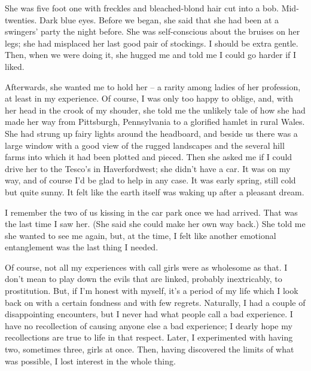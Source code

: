 She was five foot one with freckles and bleached-blond hair cut into a bob. Mid-twenties. Dark blue eyes. Before we began, she said that she had been at a swingers' party the night before. She was self-conscious about the bruises on her legs; she had misplaced her last good pair of stockings. I should be extra gentle. Then, when we were doing it, she hugged me and told me I could go harder if I liked.

Afterwards, she wanted me to hold her -- a rarity among ladies of her profession, at least in my experience. Of course, I was only too happy to oblige, and, with her head in the crook of my shouder, she told me the unlikely tale of how she had made her way from Pittsburgh, Pennsylvania to a glorified hamlet in rural Wales. She had strung up fairy lights around the headboard, and beside us there was a large window with a good view of the rugged landscapes and the several hill farms into which it had been plotted and pieced. Then she asked me if I could drive her to the Tesco's in Haverfordwest; she didn't have a car. It was on my way, and of course I'd be glad to help in any case. It was early spring, still cold but quite sunny. It felt like the earth itself was waking up after a pleasant dream.

I remember the two of us kissing in the car park once we had arrived. That was the last time I saw her. (She said she could make her own way back.) She told me she wanted to see me again, but, at the time, I felt like another emotional entanglement was the last thing I needed.

Of course, not all my experiences with call girls were as wholesome as that. I don't mean to play down the evils that are linked, probably inextricably, to prostitution. But, if I'm honest with myself, it's a period of my life which I look back on with a certain fondness and with few regrets. Naturally, I had a couple of disappointing encounters, but I never had what people call a bad experience. I have no recollection of causing anyone else a bad experience; I dearly hope my recollections are true to life in that respect. Later, I experimented with having two, sometimes three, girls at once. Then, having discovered the limits of what was possible, I lost interest in the whole thing.

\section{}


